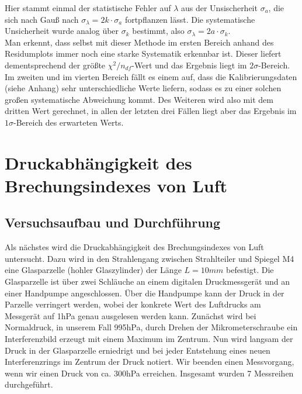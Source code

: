 \documentclass[12pt,a4paper]{article}
\begin{document}
Hier stammt einmal der statistische Fehler auf $\lambda$ aus der Unsischerheit $\sigma_a$, die sich nach Gauß nach $\sigma_{\lambda} = 2k \cdot \sigma_a$ fortpflanzen lässt. Die systematische Unsicherheit wurde analog über $\sigma_k$ bestimmt, also $\sigma_{\lambda} = 2a\cdot \sigma_{k}$.\\
Man erkennt, dass selbst mit dieser Methode im ersten Bereich anhand des Residumplots immer noch eine starke Systematik erkennbar ist. Dieser liefert dementsprechend der größte $\chi^2/n_{df}$-Wert und das Ergebnis liegt im $2\sigma$-Bereich. Im zweiten und im vierten Bereich fällt es einem auf, dass die Kalibrierungsdaten (siehe Anhang) sehr unterschiedliche Werte liefern, sodass es zu einer solchen großen systematische Abweichung kommt. Des Weiteren wird also mit dem dritten Wert gerechnet, in allen der letzten drei Fällen liegt aber das Ergebnis im $1\sigma$-Bereich des erwarteten Werts.
\section{Druckabhängigkeit des Brechungsindexes von Luft}
\subsection{Versuchsaufbau und Durchführung}
Als nächstes wird die Druckabhängigkeit des Brechungsindexes von Luft untersucht. Dazu wird in den Strahlengang zwischen Strahlteiler und Spiegel M4 eine Glasparzelle (hohler Glaszylinder) der Länge $L=10mm$ befestigt. Die Glasparzelle ist über zwei Schläuche an einem digitalen Druckmessgerät und an einer Handpumpe angeschlossen. Über die Handpumpe kann der Druck in der Parzelle verringert werden, wobei der konkrete Wert des Luftdrucks am Messgerät auf 1hPa genau ausgelesen werden kann. Zunächst wird bei Normaldruck, in unserem Fall 995hPa, durch Drehen der Mikrometerschraube ein Interferenzbild erzeugt mit einem Maximum im Zentrum. Nun wird langsam der Druck in der Glasparzelle erniedrigt und bei jeder Entstehung eines neuen Interferenzrings im Zentrum der Druck notiert. Wir beenden einen Messvorgang, wenn wir einen Druck von ca. 300hPa erreichen. Insgesamt wurden 7 Messreihen durchgeführt.
\end{document}

